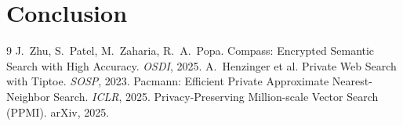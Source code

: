 \documentclass[11pt]{article}
\begin{document}
\section{Conclusion}
\label{sec:conclusion}

\begin{thebibliography}{9}
 J.~Zhu, S.~Patel, M.~Zaharia, R.~A.~Popa.
  Compass: Encrypted Semantic Search with High Accuracy. \emph{OSDI}, 2025.
 A.~Henzinger et al.
  Private Web Search with Tiptoe. \emph{SOSP}, 2023.
 Pacmann: Efficient Private Approximate Nearest-Neighbor
  Search. \emph{ICLR}, 2025. %
 Privacy-Preserving Million-scale Vector Search (PPMI).
  arXiv, 2025. %
\end{thebibliography}
\end{document}
